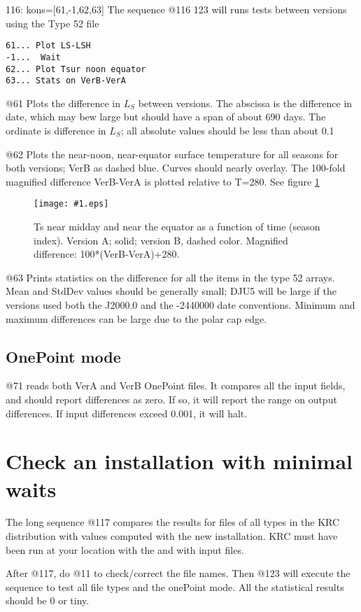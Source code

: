 \documentclass{article}  %
\newcommand{\igc}[1]{\texttt{[image: \#1.eps]}}
\begin{document}
116: kons=[61,-1,62,63]  The sequence @116 123 will runs tests between versions using the Type 52 file
\vspace{-3.mm} 
\begin{verbatim}
61... Plot LS-LSH
-1...  Wait
62... Plot Tsur noon equator
63... Stats on VerB-VerA
\end{verbatim}
@61 Plots the difference in $L_S$ between versions. The abscissa is the difference in date, which may bew large but should have a span of about 690 days. The ordinate is difference in $L_S$;  all absolute values should be less than about 0.1

@62 Plots the near-noon, near-equator surface temperature for all seasons for
both versions; VerB as dashed blue. Curves should nearly overlay. The 100-fold
magnified difference VerB-VerA is plotted relative to T=280. See figure
\ref{p62}

\begin{figure}[!ht] \igc{p62}
\caption[Seasonal Equator Noon] {Ts near midday and near the equator as a function of time (season index). Version A; solid; version B, dashed color. Magnified difference:  100*(VerB-VerA)+280. 
\label{p62} } \end{figure}

@63 Prints statistics on the difference for all the items in the type 52
arrays. Mean and StdDev values should be generally small; DJU5 will be large if
the versions used both the J2000.0 and the -2440000 date conventions. Minimum
and maximum differences can be large due to the polar cap edge.

\subsection{OnePoint mode}
 @71 reads both VerA and VerB OnePoint files. It compares all the input fields, and should report differences as zero. If so, it will report the range on output differences. If input differences exceed 0.001, it will halt.

\section{Check an installation with minimal waits}
The long sequence @117 compares the results for files of all types in the KRC distribution with values computed
with the new installation.  KRC must have been run at your location with the
 and with  input files.

After @117, do @11 to check/correct the file names.  Then @123 will execute the
 sequence to test all file types and the onePoint mode.  All the statistical
 results should be 0 or tiny.
\end{document}
